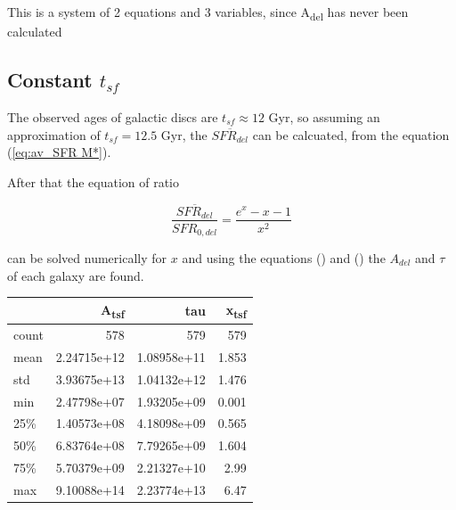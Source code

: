 \documentclass[a4paper,twocolumn]{article}
\begin{document}
This is a system of 2 equations and 3 variables, since A\textsubscript{del} has never been calculated

\subsection{Constant \(t_{sf}\)}
\label{sec:orgdbc251f}
The observed ages of galactic discs are \(t_{sf}\approx 12\) Gyr\autocite{knoxSurveyCoolWhite1999}, so assuming an approximation of \(t_{sf}=12.5\) Gyr, the \(\overline{SFR_{del}}\) can be calcuated, from the equation (\ref{eq:av_SFR M*}).

After that the equation of ratio



\begin{equation} \label{eq:ratio}
    \frac{\overline{SFR_{del}}}{SFR_{0,del}}=\frac{e^x-x-1}{x^2}
\end{equation}

can be solved numerically for \(x\) and using the equations () and () the \(A_{del}\) and \(\tau\) of each galaxy are found.

\begin{center}
\begin{tabular}{lrrr}
 & A\textsubscript{tsf} & tau & x\textsubscript{tsf}\\[0pt]
\hline
count & 578 & 579 & 579\\[0pt]
mean & 2.24715e+12 & 1.08958e+11 & 1.853\\[0pt]
std & 3.93675e+13 & 1.04132e+12 & 1.476\\[0pt]
min & 2.47798e+07 & 1.93205e+09 & 0.001\\[0pt]
25\% & 1.40573e+08 & 4.18098e+09 & 0.565\\[0pt]
50\% & 6.83764e+08 & 7.79265e+09 & 1.604\\[0pt]
75\% & 5.70379e+09 & 2.21327e+10 & 2.99\\[0pt]
max & 9.10088e+14 & 2.23774e+13 & 6.47\\[0pt]
\end{tabular}
\end{center}
\end{document}
